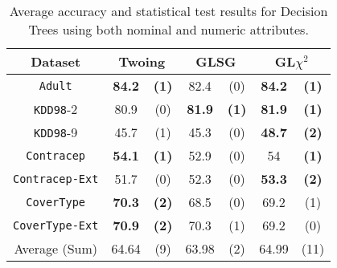 \begin{table}
\small
\caption{Average accuracy and statistical test results for  Decision Trees using both nominal and numeric attributes.}
\centering
\begin{tabular}{c|cc|cc|cc} 
Dataset &        \multicolumn{2}{c|}{Twoing} &   \multicolumn{2}{c|}{GLSG} &   \multicolumn{2}{c}{GL$\chi^2$} \\  \hline   
{\tt Adult}      &   {\bf 84.2 }  & {\bf (1) }    & 82.4  & (0)   &  {\bf 84.2} & {\bf (1) }        \\
{\tt KDD98}-2      & 80.9   & (0)      & {\bf 81.9 }& {\bf (1)}   & {\bf 81.9}  & {\bf (1)}        \\ 
{\tt KDD98}-9      & 45.7 &   (1)    & 45.3 &  (0)  & {\bf 48.7 }  &{\bf  (2)  }        \\ 
{\tt Contracep}  &{\bf  54.1  }&{\bf   (1)}      & 52.9   &  (0)  & 54    &{\bf  (1) }     \\ 
{\tt Contracep-Ext}  & 51.7  &  (0)      & 52.3   &  (0) & {\bf 53.3 }   & {\bf (2) }    \\ 
{\tt CoverType}  &  {\bf 70.3 } &  {\bf  (2) }   &   68.5  &  (0)   &   69.2   &  (1)      \\ 
{\tt CoverType-Ext}  & {\bf 70.9}   & {\bf (2) }     &  70.3    &  (1)  &  69.2     & (0)      \\  \hline
Average (Sum)  & 64.64  &  (9)  & 63.98  &  (2)   &   64.99   &  (11)

\end{tabular}
\label{exp:secondsetnumeric}
\normalsize
\end{table}


 
